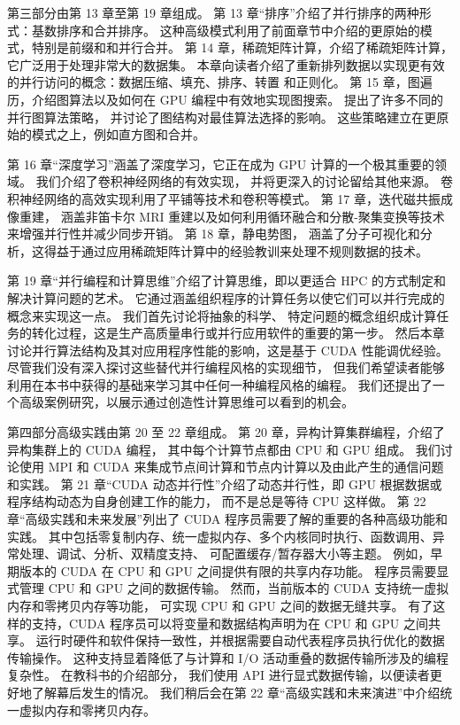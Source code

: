 第三部分由第 13 章至第 19 章组成。 第 13 章“排序”介绍了并行排序的两种形式：基数排序和合并排序。 
这种高级模式利用了前面章节中介绍的更原始的模式，特别是前缀和和并行合并。 第 14 章，稀疏矩阵计算，介绍了稀疏矩阵计算，
它广泛用于处理非常大的数据集。 本章向读者介绍了重新排列数据以实现更有效的并行访问的概念：数据压缩、填充、排序、转置
和正则化。 第 15 章，图遍历，介绍图算法以及如何在 GPU 编程中有效地实现图搜索。 提出了许多不同的并行图算法策略，
并讨论了图结构对最佳算法选择的影响。 这些策略建立在更原始的模式之上，例如直方图和合并。

第 16 章“深度学习”涵盖了深度学习，它正在成为 GPU 计算的一个极其重要的领域。 我们介绍了卷积神经网络的有效实现，
并将更深入的讨论留给其他来源。 卷积神经网络的高效实现利用了平铺等技术和卷积等模式。 第 17 章，迭代磁共振成像重建，
涵盖非笛卡尔 MRI 重建以及如何利用循环融合和分散-聚集变换等技术来增强并行性并减少同步开销。 第 18 章，静电势图，
涵盖了分子可视化和分析，这得益于通过应用稀疏矩阵计算中的经验教训来处理不规则数据的技术。

第 19 章“并行编程和计算思维”介绍了计算思维，即以更适合 HPC 的方式制定和解决计算问题的艺术。 
它通过涵盖组织程序的计算任务以使它们可以并行完成的概念来实现这一点。 我们首先讨论将抽象的科学、
特定问题的概念组织成计算任务的转化过程，这是生产高质量串行或并行应用软件的重要的第一步。 
然后本章讨论并行算法结构及其对应用程序性能的影响，这是基于 CUDA 性能调优经验。 
尽管我们没有深入探讨这些替代并行编程风格的实现细节，
但我们希望读者能够利用在本书中获得的基础来学习其中任何一种编程风格的编程。 
我们还提出了一个高级案例研究，以展示通过创造性计算思维可以看到的机会。

第四部分高级实践由第 20 至 22 章组成。 第 20 章，异构计算集群编程，介绍了异构集群上的 CUDA 编程，
其中每个计算节点都由 CPU 和 GPU 组成。 
我们讨论使用 MPI 和 CUDA 来集成节点间计算和节点内计算以及由此产生的通信问题和实践。 
第 21 章“CUDA 动态并行性”介绍了动态并行性，即 GPU 根据数据或程序结构动态为自身创建工作的能力，
而不是总是等待 CPU 这样做。 第 22 章“高级实践和未来发展”列出了 CUDA 程序员需要了解的重要的各种高级功能和实践。 
其中包括零复制内存、统一虚拟内存、多个内核同时执行、函数调用、异常处理、调试、分析、双精度支持、
可配置缓存/暂存器大小等主题。 例如，早期版本的 CUDA 在 CPU 和 GPU 之间提供有限的共享内存功能。 
程序员需要显式管理 CPU 和 GPU 之间的数据传输。 然而，当前版本的 CUDA 支持统一虚拟内存和零拷贝内存等功能，
可实现 CPU 和 GPU 之间的数据无缝共享。 有了这样的支持，CUDA 程序员可以将变量和数据结构声明为在 CPU 和 GPU 之间共享。 
运行时硬件和软件保持一致性，并根据需要自动代表程序员执行优化的数据传输操作。 
这种支持显着降低了与计算和 I/O 活动重叠的数据传输所涉及的编程复杂性。 在教科书的介绍部分，
我们使用 API 进行显式数据传输，以便读者更好地了解幕后发生的情况。 
我们稍后会在第 22 章“高级实践和未来演进”中介绍统一虚拟内存和零拷贝内存。

